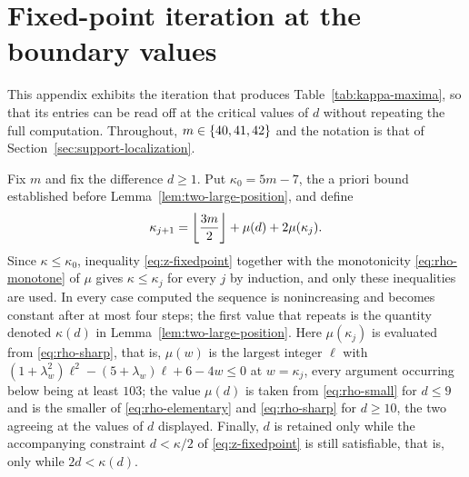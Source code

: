\documentclass[11pt]{article}
\theoremstyle{definition}
\theoremstyle{remark}
\numberwithin{equation}{section}
\DeclarePairedDelimiter{\set}{\{}{\}}
\DeclarePairedDelimiter{\floor}{\lfloor}{\rfloor}
\begin{document}
\section{Fixed-point iteration at the boundary values}\label{app:kappa-iteration}

This appendix exhibits the iteration that produces
Table~\ref{tab:kappa-maxima}, so that its entries can be read off at the
critical values of $d$ without repeating the full computation. Throughout,
$m\in\set{40,41,42}$ and the notation is that of
Section~\ref{sec:support-localization}.

Fix $m$ and fix the difference $d\ge1$. Put $\kappa_0=5m-7$, the a priori bound
established before Lemma~\ref{lem:two-large-position}, and define
\begin{equation}\label{eq:kappa-iterate}
  \kappa_{j+1}=\floor*{\frac{3m}{2}}+\mu(d)+2\mu(\kappa_j).
\end{equation}
Since $\kappa\le\kappa_0$, inequality \eqref{eq:z-fixedpoint} together with the
monotonicity \eqref{eq:rho-monotone} of $\mu$ gives $\kappa\le\kappa_j$ for every
$j$ by induction, and only these inequalities are used. In every case computed
the sequence is nonincreasing and becomes constant after at most four steps; the
first value that repeats is the quantity denoted $\kappa(d)$ in
Lemma~\ref{lem:two-large-position}. Here $\mu(\kappa_j)$
is evaluated from \eqref{eq:rho-sharp}, that is, $\mu(w)$ is the largest integer
$\ell$ with $(1+\lambda_w^2)\ell^2-(5+\lambda_w)\ell+6-4w\le0$ at $w=\kappa_j$, every
argument occurring below being at least $103$; the value $\mu(d)$ is taken from
\eqref{eq:rho-small} for $d\le9$ and is the smaller of \eqref{eq:rho-elementary}
and \eqref{eq:rho-sharp} for $d\ge10$, the two agreeing at the values of $d$
displayed. Finally, $d$ is retained only while the accompanying constraint
$d<\kappa/2$ of \eqref{eq:z-fixedpoint} is still satisfiable, that is, only while
$2d<\kappa(d)$.
\end{document}

